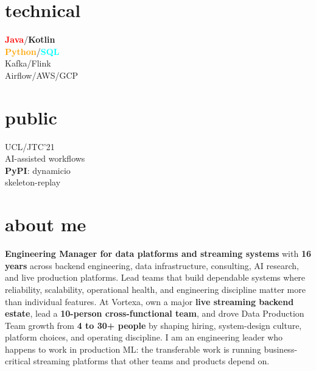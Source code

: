 \documentclass[]{../../friggeri-cv}
\begin{document}
\begin{aside}
            \section{technical}
            {\footnotesize \textbf{\textcolor{red}{Java}}/\textbf{\textcolor{red!50!black}{Kotlin}}\\\textbf{\textcolor{orange}{Python}}/\textbf{\textcolor{cyan}{SQL}}\\Kafka/Flink\\Airflow/AWS/GCP}
            \section{public}
            {\footnotesize UCL/JTC'21\\AI-assisted workflows\\\textbf{PyPI}: dynamicio\\skeleton-replay}
    \end{aside}

\section{about me}
{\small \textbf{Engineering Manager for data platforms and streaming systems} with \textbf{16 years} across backend engineering, data infrastructure, consulting, AI research, and live production platforms. Lead teams that build dependable systems where reliability, scalability, operational health, and engineering discipline matter more than individual features. At Vortexa, own a major \textbf{live streaming backend estate}, lead a \textbf{10-person cross-functional team}, and drove Data Production Team growth from \textbf{4 to 30+ people} by shaping hiring, system-design culture, platform choices, and operating discipline. I am an engineering leader who happens to work in production ML: the transferable work is running business-critical streaming platforms that other teams and products depend on.}
\end{document}
